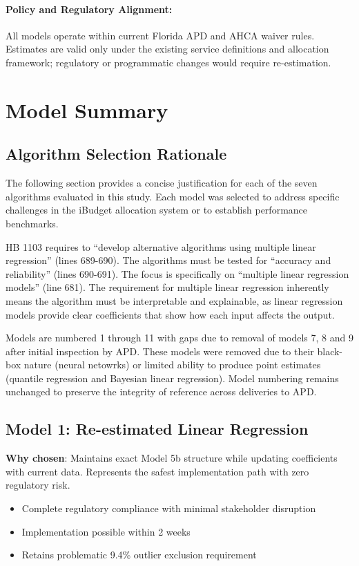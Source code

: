 \paragraph{Policy and Regulatory Alignment:} All models operate within current Florida APD and AHCA waiver rules.  Estimates are valid only under the existing service definitions and allocation framework; regulatory or programmatic changes would require re-estimation.

\section{Model Summary}

\subsection{Algorithm Selection Rationale}

The following section provides a concise justification for each of the seven algorithms evaluated in this study. Each model was selected to address specific challenges in the iBudget allocation system or to establish performance benchmarks.

HB 1103  requires to ``develop alternative algorithms using multiple linear regression'' (lines 689-690). The algorithms must be tested for ``accuracy and reliability'' (lines 690-691). The focus is specifically on ``multiple linear regression models'' (line 681). The requirement for multiple linear regression inherently means the algorithm must be interpretable and explainable, as linear regression models provide clear coefficients that show how each input affects the output.

Models are numbered 1 through 11 with gaps due to removal of models 7, 8 and 9 after initial inspection by APD. These models were removed due to their black-box nature (neural netowrks) or limited ability to produce point estimates (quantile regression and Bayesian linear regression). Model numbering remains unchanged to preserve the integrity of reference across deliveries to APD. 

\subsection{Model 1: Re-estimated Linear Regression}
\textbf{Why chosen}: Maintains exact Model 5b structure while updating coefficients with current data. Represents the safest implementation path with zero regulatory risk.
\begin{itemize}
    \item Complete regulatory compliance with minimal stakeholder disruption
    \item Implementation possible within 2 weeks
    \item Retains problematic 9.4\% outlier exclusion requirement
\end{itemize}

